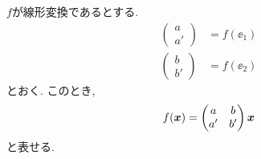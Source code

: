 \begin{remark}
  \label{def:repmat}
  $f$が線形変換であるとする.
  \begin{align*}
    \begin{pmatrix}
      a\\a'
    \end{pmatrix}
    &=f(\ee_1)\\
     \begin{pmatrix}
      b\\b'
    \end{pmatrix}
    &=f(\ee_2)
  \end{align*}
  とおく.  このとき,
  \begin{align*}
    f(\boldsymbol{x})=
    \begin{pmatrix}
      a&b\\a'&b'
    \end{pmatrix}\boldsymbol{x}
  \end{align*}
  と表せる.
\end{remark}

